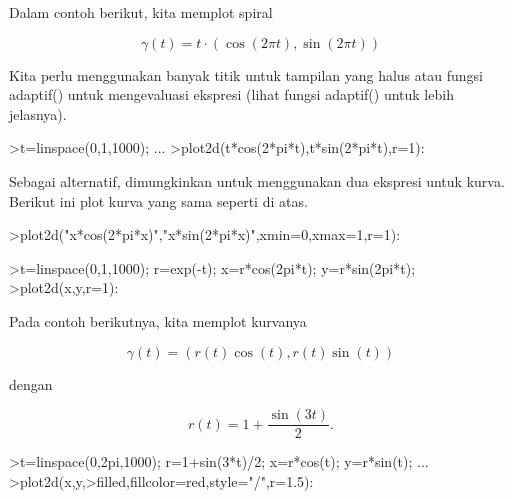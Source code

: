 \begin{eulernotebook}
\begin{eulercomment}
Dalam contoh berikut, kita memplot spiral

\end{eulercomment}
\begin{eulerformula}
\[
\gamma(t) = t \cdot (\cos(2\pi t),\sin(2\pi t))
\]
\end{eulerformula}
\begin{eulercomment}
Kita perlu menggunakan banyak titik untuk tampilan yang halus atau
fungsi adaptif() untuk mengevaluasi ekspresi (lihat fungsi adaptif()
untuk lebih jelasnya).
\end{eulercomment}
\begin{eulerprompt}
>t=linspace(0,1,1000); ...
>plot2d(t*cos(2*pi*t),t*sin(2*pi*t),r=1):
\end{eulerprompt}
\begin{eulercomment}
Sebagai alternatif, dimungkinkan untuk menggunakan dua ekspresi untuk
kurva. Berikut ini plot kurva yang sama seperti di atas.
\end{eulercomment}
\begin{eulerprompt}
>plot2d("x*cos(2*pi*x)","x*sin(2*pi*x)",xmin=0,xmax=1,r=1):
\end{eulerprompt}
\begin{eulerprompt}
>t=linspace(0,1,1000); r=exp(-t); x=r*cos(2pi*t); y=r*sin(2pi*t);
>plot2d(x,y,r=1):
\end{eulerprompt}
\begin{eulercomment}
Pada contoh berikutnya, kita memplot kurvanya

\end{eulercomment}
\begin{eulerformula}
\[
\gamma(t) = (r(t) \cos(t), r(t) \sin(t))
\]
\end{eulerformula}
\begin{eulercomment}
dengan

\end{eulercomment}
\begin{eulerformula}
\[
r(t) = 1 + \dfrac{\sin(3t)}{2}.
\]
\end{eulerformula}
\begin{eulerprompt}
>t=linspace(0,2pi,1000); r=1+sin(3*t)/2; x=r*cos(t); y=r*sin(t); ...
>plot2d(x,y,>filled,fillcolor=red,style="/",r=1.5):
\end{eulerprompt}
\\


\end{eulernotebook}

